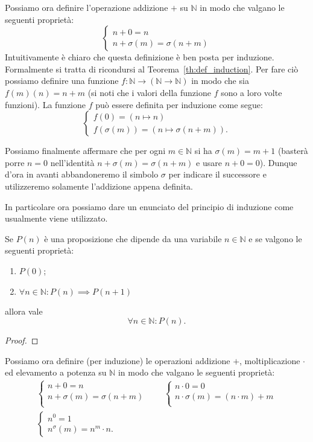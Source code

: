 \documentclass[italian,a4paper,twosides,headinclude]{scrbook}
\newcommand{\NN}{\mathbb N}
\begin{document}
Possiamo ora definire l'operazione addizione $+$ su $\NN$ in modo che valgano le seguenti proprietà:
\[
   \begin{cases}
     n + 0 = n \\
     n + \sigma(m) = \sigma(n+m)
   \end{cases}
\]
Intuitivamente è chiaro che questa definizione è ben posta per induzione.
Formalmente si tratta di ricondursi al
Teorema~\ref{th:def_induction}. Per fare ciò possiamo definire una funzione $f\colon \NN \to (\NN\to \NN)$ in modo che sia $f(m)(n) = n+m$ (si noti che i valori della funzione $f$ sono a loro volte funzioni). La funzione $f$ può essere definita
per induzione come segue:
\[
 \begin{cases}
 f(0) = (n\mapsto n)\\
 f(\sigma(m)) = (n\mapsto \sigma(n+m)).
 \end{cases}
\]

Possiamo finalmente affermare che per ogni $m\in \NN$ si ha $\sigma(m)=m+1$ (basterà porre $n=0$ nell'identità $n+\sigma(m)=\sigma(n+m)$ e usare $n+0=0$).
Dunque d'ora in avanti abbandoneremo il simbolo $\sigma$ per indicare il successore e utilizzeremo solamente l'addizione appena definita.

In particolare ora possiamo dare un enunciato del principio di induzione come usualmente viene utilizzato.

\begin{theorem}
Se $P(n)$ è una proposizione che dipende da una variabile $n\in \NN$ e se valgono le seguenti proprietà:
\begin{enumerate}
\item $P(0)$;
\item $\forall n\in \NN\colon P(n) \implies P(n+1)$
\end{enumerate}
allora vale
\[
  \forall n\in \NN \colon P(n).
\]
\end{theorem}
\begin{proof}

\end{proof}

Possiamo ora definire (per induzione) le operazioni addizione $+$, moltiplicazione $\cdot$ ed elevamento a potenza su $\NN$ in modo che valgano le seguenti proprietà:
\begin{gather*}
   \begin{cases}
     n + 0 = n \\
     n + \sigma(m) = \sigma(n+m)\\
   \end{cases}
   \qquad
   \begin{cases}
     n \cdot 0 = 0\\
     n \cdot \sigma(m) = (n\cdot m) + m\\
   \end{cases}
   \\
   \begin{cases}
     n ^ 0 = 1\\
     n ^ \sigma(m) = n^m \cdot n.
   \end{cases}
\end{gather*}
\end{document}
